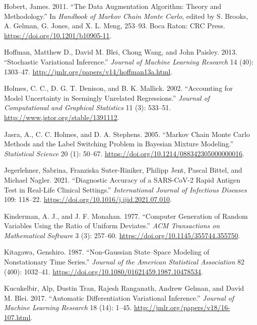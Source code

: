 \documentclass[
  11pt,
  letterpaper,
]{scrbook}
\newlength{\cslhangindent}
\newenvironment{CSLReferences}[2] %
 {\begin{list}{}{%
  \setlength{\itemindent}{0pt}
  \setlength{\leftmargin}{0pt}
  \setlength{\parsep}{0pt}
  \ifodd #1
   \setlength{\leftmargin}{\cslhangindent}
   \setlength{\itemindent}{-1\cslhangindent}
  \fi
  \setlength{\itemsep}{#2\baselineskip}}}
 {\end{list}}
\theoremstyle{plain}
\theoremstyle{plain}
\theoremstyle{plain}
\theoremstyle{definition}
\theoremstyle{definition}
\theoremstyle{definition}
\theoremstyle{remark}
\begin{document}
\begin{CSLReferences}{1}{0}
Hobert, James. 2011. {``The Data Augmentation Algorithm: Theory and
Methodology.''} In \emph{Handbook of {M}arkov Chain {M}onte {C}arlo},
edited by S. Brooks, A. Gelman, G. Jones, and X. L. Meng, 253--93. Boca
Raton: CRC Press. \url{https://doi.org/10.1201/b10905-11}.

Hoffman, Matthew D., David M. Blei, Chong Wang, and John Paisley. 2013.
{``Stochastic Variational Inference.''} \emph{Journal of Machine
Learning Research} 14 (40): 1303--47.
\url{http://jmlr.org/papers/v14/hoffman13a.html}.

Holmes, C. C., D. G. T. Denison, and B. K. Mallick. 2002. {``Accounting
for Model Uncertainty in Seemingly Unrelated Regressions.''}
\emph{Journal of Computational and Graphical Statistics} 11 (3):
533--51. \url{http://www.jstor.org/stable/1391112}.

Jasra, A., C. C. Holmes, and D. A. Stephens. 2005. {``{M}arkov Chain
{M}onte {C}arlo Methods and the Label Switching Problem in {B}ayesian
Mixture Modeling.''} \emph{Statistical Science} 20 (1): 50--67.
\url{https://doi.org/10.1214/088342305000000016}.

Jegerlehner, Sabrina, Franziska Suter-Riniker, Philipp Jent, Pascal
Bittel, and Michael Nagler. 2021. {``Diagnostic Accuracy of a
{SARS-CoV-2} Rapid Antigen Test in Real-Life Clinical Settings.''}
\emph{International Journal of Infectious Diseases} 109: 118--22.
\url{https://doi.org/10.1016/j.ijid.2021.07.010}.

Kinderman, A. J., and J. F. Monahan. 1977. {``Computer Generation of
Random Variables Using the Ratio of Uniform Deviates.''} \emph{ACM
Transactions on Mathematical Software} 3 (3): 257--60.
\url{https://doi.org/10.1145/355744.355750}.

Kitagawa, Genshiro. 1987. {``Non-{G}aussian State--Space Modeling of
Nonstationary Time Series.''} \emph{Journal of the American Statistical
Association} 82 (400): 1032--41.
\url{https://doi.org/10.1080/01621459.1987.10478534}.

Kucukelbir, Alp, Dustin Tran, Rajesh Ranganath, Andrew Gelman, and David
M. Blei. 2017. {``Automatic Differentiation Variational Inference.''}
\emph{Journal of Machine Learning Research} 18 (14): 1--45.
\url{http://jmlr.org/papers/v18/16-107.html}.


\end{CSLReferences}
\end{document}
